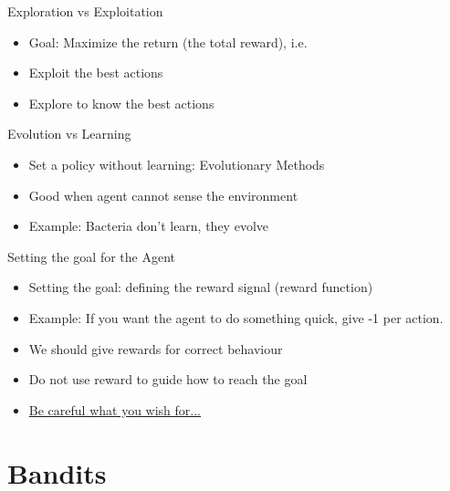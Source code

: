 \documentclass[10pt]{beamer}
\begin{document}
\begin{frame}{Exploration vs Exploitation}

\begin{itemize}
\item {\color{uured} Goal}: Maximize the return (the total reward), i.e.\pause
\item {\color{uured} Exploit} the best actions\pause
\item {\color{uured} Explore} to know the best actions
\end{itemize}

\end{frame}

\begin{frame}{Evolution vs Learning}

\begin{itemize}
\item Set a policy without learning: {\color{uured} Evolutionary} Methods
\item Good when agent cannot sense the environment\pause
\item {\color{uured} Example}: Bacteria don't learn, they evolve
\end{itemize}

\end{frame}


\begin{frame}{Setting the goal for the Agent}

\begin{itemize}
\item Setting the goal: {\color{uured} defining the reward} signal (reward function)
\item {\color{uured} Example}: If you want the agent to do something quick, give -1 per action.\pause
\item We should give rewards for correct {\color{uured} behaviour}
\item Do {\color{uured} not} use reward to guide {\color{uured} how} to reach the goal
\item \href{https://openai.com/blog/faulty-reward-functions/}{{\color{blue} Be careful what you wish for...}}
\end{itemize}

\end{frame}


\section{Bandits}
\end{document}
